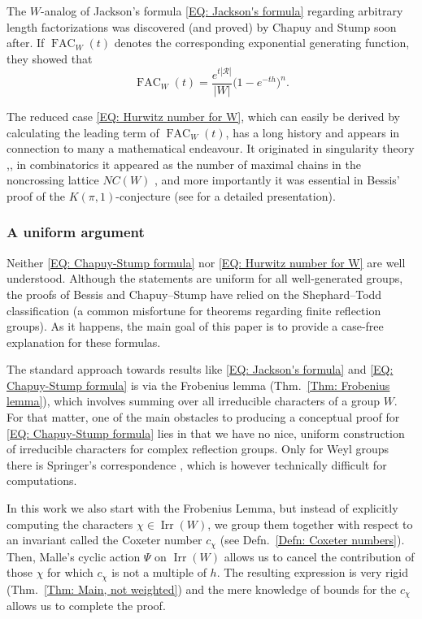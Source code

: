 \documentclass[ALCO, Unicode]{cedram}
\newcommand{\op}[1]{\operatorname{#1}}
\newcommand{\op}[1]{\operatorname{#1}}
\begin{document}
The $W$-analog of Jackson's formula \eqref{EQ: Jackson's formula} regarding arbitrary length factorizations was discovered (and proved) by Chapuy and Stump \cite{chapuy-stump} soon after. If $\op{FAC}_W(t)$ denotes the corresponding exponential generating function, they showed that \begin{equation}
\op{FAC}_W(t)=\dfrac{e^{t|\mathcal{R}|}}{|W|}\big( 1-e^{-th}\big)^n.\label{EQ: Chapuy-Stump formula}
\end{equation}

The reduced case \eqref{EQ: Hurwitz number for W}, which can easily be derived by calculating the leading term of $\op{FAC}_W(t)$, has a long history and appears in connection to many a mathematical endeavour. It originated in singularity theory \cite[Conj.~(3.5)]{looij-complement-bifurc},\cite{deligne-letter-to-looijenga,kluitmann-thesis}, in combinatorics it appeared as the number of maximal chains in the noncrossing lattice $NC(W)$ \cite[Prop.~9]{chapoton-enumerative-properties}, and more importantly it was essential in Bessis' proof of the $K(\pi,1)$-conjecture \cite{bes-kpi1} (see \cite[\S~1]{theo-thesis} for a detailed presentation).

\subsubsection*{A uniform argument}

Neither \eqref{EQ: Chapuy-Stump formula} nor \eqref{EQ: Hurwitz number for W} are well understood. Although the statements are uniform for all well-generated groups, the proofs of Bessis and Chapuy--Stump have relied on the Shephard--Todd classification (a common misfortune for theorems regarding finite reflection groups). As it happens, the main goal of this paper is to provide a case-free explanation for these formulas. 

The standard approach towards results like \eqref{EQ: Jackson's formula} and \eqref{EQ: Chapuy-Stump formula} is via the Frobenius lemma (Thm.~\ref{Thm: Frobenius lemma}), which involves summing over all irreducible characters of a group $W$. For that matter, one of the main obstacles to producing a conceptual proof for \eqref{EQ: Chapuy-Stump formula} lies in that we have no nice, uniform construction of irreducible characters for complex reflection groups. Only for Weyl groups there is Springer's correspondence \cite{springer-correspondence}, which is however technically difficult for computations. 

In this work we also start with the Frobenius Lemma, but instead of explicitly computing the characters $\chi\in\op{Irr}(W)$, we group them together with respect to an invariant called the Coxeter number $c_{\chi}$ (see Defn.~\ref{Defn: Coxeter numbers}). Then, Malle's cyclic action $\Psi$ on $\op{Irr}(W)$ allows us to cancel the contribution of those $\chi$ for which $c_{\chi}$ is not a multiple of $h$. The resulting expression is very rigid (Thm.~\ref{Thm: Main, not weighted}) and the mere knowledge of bounds for the $c_{\chi}$ allows us to complete the proof.
\end{document}
